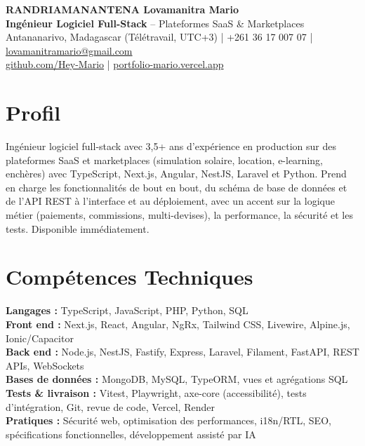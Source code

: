 \documentclass[10pt,a4paper]{article}
\begin{document}
\begin{center}
  {\LARGE\bfseries RANDRIAMANANTENA Lovamanitra Mario}\\[3pt]
  {\large\color{accent}\textbf{Ingénieur Logiciel Full-Stack}} -- Plateformes SaaS \& Marketplaces\\[3pt]
  Antananarivo, Madagascar (Télétravail, UTC+3) | +261 36 17 007 07 |
  \href{mailto:lovamanitramario@gmail.com}{lovamanitramario@gmail.com}\\
  \href{https://github.com/Hey-Mario}{github.com/Hey-Mario} |
  \href{https://portfolio-mario.vercel.app}{portfolio-mario.vercel.app}
\end{center}

\section*{Profil}
Ingénieur logiciel full-stack avec 3,5+ ans d'expérience en production sur des plateformes SaaS et marketplaces
(simulation solaire, location, e-learning, enchères) avec TypeScript, Next.js, Angular, NestJS, Laravel et Python.
Prend en charge les fonctionnalités de bout en bout, du schéma de base de données et de l'API REST à l'interface
et au déploiement, avec un accent sur la logique métier (paiements, commissions, multi-devises), la performance,
la sécurité et les tests. Disponible immédiatement.

\section*{Compétences Techniques}
\textbf{Langages :} TypeScript, JavaScript, PHP, Python, SQL\\
\textbf{Front end :} Next.js, React, Angular, NgRx, Tailwind CSS, Livewire, Alpine.js, Ionic/Capacitor\\
\textbf{Back end :} Node.js, NestJS, Fastify, Express, Laravel, Filament, FastAPI, REST APIs, WebSockets\\
\textbf{Bases de données :} MongoDB, MySQL, TypeORM, vues et agrégations SQL\\
\textbf{Tests \& livraison :} Vitest, Playwright, axe-core (accessibilité), tests d'intégration, Git, revue de code, Vercel, Render\\
\textbf{Pratiques :} Sécurité web, optimisation des performances, i18n/RTL, SEO, spécifications fonctionnelles, développement assisté par IA

\end{document}
